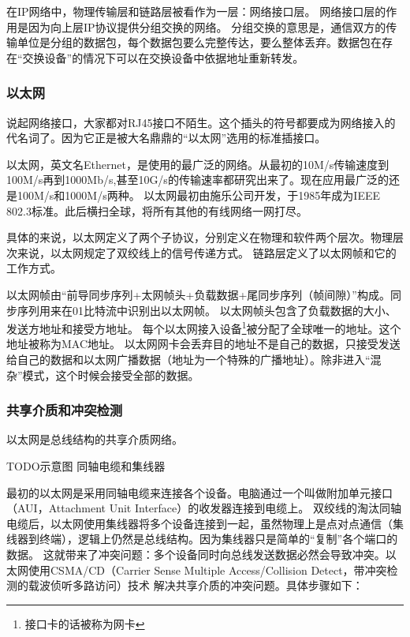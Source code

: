 在IP网络中，物理传输层和链路层被看作为一层：网络接口层。
网络接口层的作用是因为向上层IP协议提供分组交换的网络。
分组交换的意思是，通信双方的传输单位是分组的数据包，每个数据包要么完整传达，要么整体丢弃。数据包在存在“交换设备”的情况下可以在交换设备中依据地址重新转发。

\subsubsection{以太网}

说起网络接口，大家都对RJ45接口不陌生。这个插头的符号都要成为网络接入的代名词了。因为它正是被大名鼎鼎的“以太网”选用的标准插接口。



以太网，英文名Ethernet，是使用的最广泛的网络。从最初的10M/s传输速度到100M/s再到1000Mb/s,甚至10G/s的传输速率都研究出来了。现在应用最广泛的还是100M/s和1000M/s两种。
以太网最初由施乐公司开发，于1985年成为IEEE 802.3标准。此后横扫全球，将所有其他的有线网络一网打尽。

具体的来说，以太网定义了两个子协议，分别定义在物理和软件两个层次。物理层次来说，以太网规定了双绞线上的信号传递方式。%
链路层定义了以太网帧和它的工作方式。

以太网帧由“前导同步序列+太网帧头+负载数据+尾同步序列（帧间隙）”构成。同步序列用来在01比特流中识别出以太网帧。
以太网帧头包含了负载数据的大小、发送方地址和接受方地址。
每个以太网接入设备\footnote{接口卡的话被称为网卡}被分配了全球唯一的地址。这个地址被称为MAC地址。
以太网网卡会丢弃目的地址不是自己的数据，只接受发送给自己的数据和以太网广播数据（地址为一个特殊的广播地址）。除非进入“混杂”模式，这个时候会接受全部的数据。

\subsubsection*{共享介质和冲突检测}

以太网是总线结构的共享介质网络。

TODO示意图 同轴电缆和集线器 %

最初的以太网是采用同轴电缆来连接各个设备。电脑通过一个叫做附加单元接口（AUI，Attachment Unit Interface）的收发器连接到电缆上。
双绞线的淘汰同轴电缆后，以太网使用集线器将多个设备连接到一起，虽然物理上是点对点通信（集线器到终端），逻辑上仍然是总线结构。因为集线器只是简单的“复制”各个端口的数据。
这就带来了冲突问题：多个设备同时向总线发送数据必然会导致冲突。以太网使用CSMA/CD（Carrier Sense Multiple Access/Collision Detect，带冲突检测的载波侦听多路访问）技术
解决共享介质的冲突问题。具体步骤如下：

